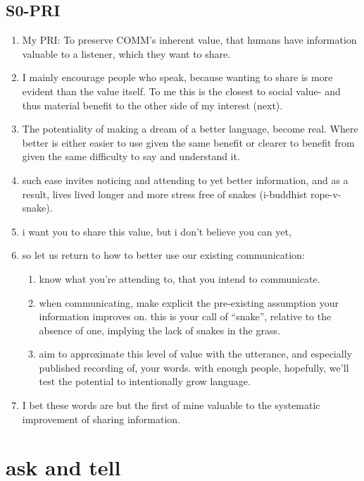 \documentclass[
]{book}
\providecommand{\tightlist}{%
  \setlength{\itemsep}{0pt}\setlength{\parskip}{0pt}}
\begin{document}
\hypertarget{s0-pri}{%
\subsection{S0-PRI}\label{s0-pri}}

\begin{enumerate}
\def\labelenumi{\arabic{enumi}.}
\item
  My PRI: To preserve COMM's inherent value, that humans have information valuable to a listener, which they want to share.
\item
  I mainly encourage people who speak, because wanting to share is more evident than the value itself. To me this is the closest to social value- and thus material benefit to the other side of my interest (next).
\item
  The potentiality of making a dream of a better language, become real.
  Where better is either easier to use given the same benefit or clearer to benefit from given the same difficulty to say and understand it.
\item
  such ease invites noticing and attending to yet better information, and as a result, lives lived longer and more stress free of snakes (i-buddhist rope-v-snake).
\item
  i want you to share this value, but i don't believe you can yet,
\item
  so let us return to how to better use our existing communication:

  \begin{enumerate}
  \def\labelenumii{\arabic{enumii}.}
  \tightlist
  \item
    know what you're attending to, that you intend to communicate.
  \item
    when communicating, make explicit the pre-existing assumption your information improves on. this is your call of ``snake'', relative to the absence of one, implying the lack of snakes in the grass.
  \item
    aim to approximate this level of value with the utterance, and especially published recording of, your words.
    with enough people, hopefully, we'll test the potential to intentionally grow language.
  \end{enumerate}
\item
  I bet these words are but the first of mine valuable to the systematic improvement of sharing information.
\end{enumerate}

\hypertarget{ask-and-tell}{%
\section{ask and tell}\label{ask-and-tell}}
\end{document}
